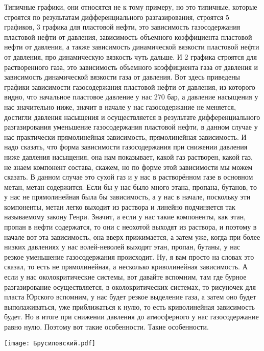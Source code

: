 \documentclass[main.tex]{subfiles}
\begin{document}
Типичные графики, они относятся не к тому примеру, но это типичные, которые строятся по результатам дифференциального разгазирования, строятся 5 графиков, 3 графика для пластовой нефти, это зависимость газосодержания пластовой нефти от давления, зависимость объемного коэффициента пластовой нефти от давления, а также зависимость динамической вязкости пластовой нефти от давления, про динамическую вязкость чуть дальше.
И 2 графика строятся для растворенного газа, это зависимость объемного коэффициента газа от давления и зависимость динамической вязкости газа от давления.
Вот здесь приведены графики зависимости газосодержания пластовой нефти от давления, из которого видно, что начальное пластовое давление у нас 270 бар, а давление насыщения у нас значительно ниже, значит в начале у нас газосодержание не меняется, достигли давления насыщения и осуществляется в результате дифференциального разгазирования уменьшение газосодержания пластовой нефти, в данном случае у нас практически прямолинейная зависимость, прямолинейная зависимость.
И надо сказать, что форма зависимости газосодержания при снижении давления ниже давления насыщения, она нам показывает, какой газ растворен, какой газ, не знаем компонент состава, скажем, но по форме этой зависимости мы можем сказать.
В данном случае это сухой газ и у нас в растворённом газе в основном метан, метан содержится.
Если бы у нас было много этана, пропана, бутанов, то у нас не прямолинейная была бы зависимость, а у нас в начале, поскольку эти компоненты, метан легко выходит из раствора и линейно подчиняется так называемому закону Генри.
Значит, а если у нас такие компоненты, как этан, пропан в нефти содержатся, то они с неохотой выходят из раствора, и поэтому в начале вот эта зависимость, она вверх прижимается, а затем уже, когда при более низких давлениях у нас волей-неволей выходят этан, пропан, бутаны, у нас резкое уменьшение газосодержания происходит.
Ну, я вам просто на словах это сказал, то есть не прямолинейная, а несколько криволинейная зависимость.
А если у нас околокритические системы, вот давайте вспомним, там где бурное разгазирование осуществляется, в околокритических системах, то рисуночек для пласта Юрского вспомним, у нас будет резкое выделение газа, а затем оно будет выполаживаться, уже приближаться к нулю, то есть криволинейная зависимость будет.
Но в итоге при снижении давления до атмосферного у нас газосодержание равно нулю.
Поэтому вот такие особенности.
Такие особенности.

\begin{center}
\texttt{[image: Брусиловский.pdf]}
\end{center}
\end{document}
